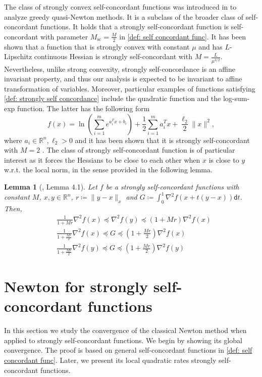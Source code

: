 \documentclass[sn-mathphys-num]{sn-jnl}%
\newcommand{\R}{\mathbb{R}}
\renewcommand{\d}{\mathsf{d}}
\theoremstyle{thmstyleone}%
\newtheorem{lemma}{Lemma}[section]
\theoremstyle{thmstyletwo}%
\theoremstyle{thmstylethree}%
\numberwithin{equation}{section}
\begin{document}
The class of strongly convex self-concordant functions was introduced in \cite{rodomanov2021greedy} to analyze greedy quasi-Newton methods. It is a subclass of the broader class of self-concordant functions. It holds that a strongly self-concordant function is self-concordant with parameter $M_\text{sc} = \frac{M}{2}$ in \eqref{def: self concordant func}.
It has been shown that a function that is strongly convex with constant $\mu$ and has $L$-Lipschitz continuous Hessian is strongly self-concordant with $M = \frac{L}{\mu^{3/2}}$. Nevertheless, unlike strong convexity, strongly self-concordance is an affine invariant property, and thus our analysis is expected to be invariant to affine transformation of variables. Moreover, particular examples of functions satisfying \cref{def: strongly self concordance} include the quadratic function and the log-sum-exp function. The latter has the following form
\begin{equation} \label{eq: example strong self concordance}
    f(x) = \ln \left( \sum_{i=1}^m e^{a_i^T x + b_i} \right) + \frac{1}{2} \sum_{i=1}^m a_i^T x + \frac{\ell_2}{2} \| x\|^2,
\end{equation}
where $a_i \in \R^n, \ell_2>0$ and it has been shown that it is strongly self-concordant with $M=2$ \cite{rodomanov2021greedy}. The class of strongly self-concordant function is of particular interest as it forces the Hessians to be close to each other when $x$ is close to $y$ w.r.t. the local norm, in the sense provided in the following lemma.
\begin{lemma}[\cite{rodomanov2021greedy}, Lemma 4.1] \label{lemma: rodomanov self-concordant}
    Let $f$ be a strongly self-concordant functions with constant $M$, $x,y \in \R^n$, $r \coloneq \| y-x\|_x$ and $G \coloneq \int_0^1 \nabla^2 f (x + t (y - x)) \d t$. Then,
    \begin{align}
        & \frac{1}{1+ Mr} \nabla^2f(x) \preceq \nabla^2f(y) \preceq \left( 1+ Mr \right) \nabla^2f(x) \label{ineq: hessian comparison x_k x_k+1} \\
        & \frac{1}{1+ \frac{Mr}{2}} \nabla^2f(x) \preceq G \preceq \left( 1+ \frac{Mr}{2} \right) \nabla^2f(x) \label{ineq: average hessian for x_k} \\
        & \frac{1}{1+ \frac{Mr}{2}} \nabla^2f(y) \preceq G \preceq \left( 1+ \frac{Mr}{2} \right) \nabla^2f(y) \label{ineq: average hessian for x_k+1}
    \end{align}    
\end{lemma}

\section{Newton for strongly self-concordant functions}
 In this section we study the convergence of the classical Newton method when applied to strongly self-concordant functions. We begin by showing its global convergence. The proof is based on general self-concordant functions in \eqref{def: self concordant func}. Later, we present its local quadratic rates strongly self-concordant functions.
\end{document}
